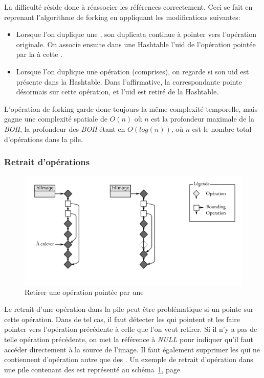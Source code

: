 			La difficulté réside donc à réassocier les références correctement. 
			Ceci se fait en reprenant l'algorithme de forking en appliquant les modifications suivantes:
			\begin{itemize}
				\item Lorsque l'on duplique une \BO, son duplicata continue à pointer vers l'opération originale.
				On associe ensuite dans une Hashtable l'uid de l'opération pointée
				par la \BO à cette \BO. 
				\item Lorsque l'on duplique une opération (\BO comprises), on regarde si son uid est présente dans
				la Hashtable. Dans l'affirmative, la \BO correspondante pointe désormais sur cette opération, et
				l'uid est retiré de la Hashtable.
			\end{itemize}
			L'opération de forking garde donc toujours la même complexité temporelle, mais gagne une complexité spatiale
			de $O(n)$ où $n$ est la profondeur maximale de la \emph{BOH}, la profondeur des \emph{BOH} étant en $O(log(n))$, où $n$
			est le nombre total d'opérations dans la pile. 
			
			\subsubsection{Retrait d'opérations}
			\begin{figure}[ht]
				\centering
				\includegraphics[width=\textwidth]{images/bo-supress} 
				\caption{Retirer une opération pointée par une \BO}
				\label{fig:bo-supress}
			\end{figure}
			Le retrait d'une opération dans la pile peut être problématique si un \BO pointe sur cette opération. Dans de
			tel cas, il faut détecter les \BO qui pointent et les faire pointer vers l'opération précédente à celle
			que l'on veut retirer. Si il n'y a pas de telle opération précédente, on met la référence à \emph{NULL} pour indiquer qu'il faut accéder directement à la source de l'image.
			Il faut également supprimer les \BO qui ne contiennent d'opération autre
			que des \BO.  Un exemple de retrait d'opération dans une pile contenant des \BO est représenté au 
			schéma~\ref{fig:bo-supress}, page~\pageref{fig:bo-supress}
			
